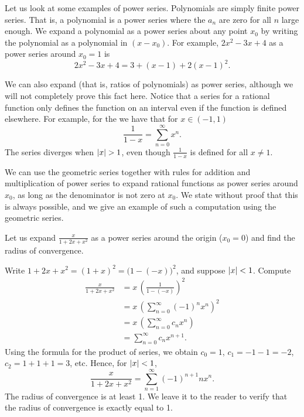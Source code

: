 Let us look at some examples of power series.
Polynomials are simply finite power series.  That is, a polynomial
is a power series where
the $a_n$ are zero for all $n$ large enough.  We expand
a polynomial as a power series about any point $x_0$ by writing
the polynomial as a polynomial in $(x-x_0)$.  For example,
$2x^2-3x+4$ as a power series around $x_0 = 1$ is
\begin{equation*}
2x^2-3x+4 = 3 + (x-1) + 2{(x-1)}^2 .
\end{equation*}

We can also expand
\emph{} (that is, ratios of polynomials)
as power series, although we will not completely prove this fact here.
Notice that a series for a rational function only defines the function
on an interval even if the function is defined elsewhere.  For example, for
the \emph{} we have that for
$x \in (-1,1)$
\begin{equation*}
\frac{1}{1-x} =
\sum_{n=0}^\infty x^n .
\end{equation*}
The series diverges when $\left\lvert {x} \right\rvert > 1$, even though $\frac{1}{1-x}$ is
defined for all $x \not= 1$.

We can use the geometric series together with rules for addition and
multiplication of power series to expand rational functions as power
series around $x_0$,
as long as the denominator is not zero at $x_0$.  We state without
proof that this is always possible, and we give an example of such
a computation using the geometric series.

\begin{example}
Let us expand $\frac{x}{1+2x+x^2}$ as a power series around the origin ($x_0 = 0$) and
find the radius of convergence.

Write $1+2x+x^2 = {(1+x)}^2 = {\bigl(1-(-x)\bigr)}^2$, and suppose
$\left\lvert {x} \right\rvert < 1$.  Compute
\begin{equation*}
\begin{split}
\frac{x}{1+2x+x^2}
&=
x \,
{\left(
\frac{1}{1-(-x)}
\right)}^2
\\
&=
x \,
{\left( 
\sum_{n=0}^\infty {(-1)}^n x^n 
\right)}^2
\\
&=
x \,
\left(
\sum_{n=0}^\infty c_n x^n 
\right)
\\
&=
\sum_{n=0}^\infty c_n x^{n+1} .
\end{split}
\end{equation*}
Using the formula for the product of series,
we obtain $c_0 = 1$, $c_1 = -1 -1 = -2$, $c_2 = 1+1+1 = 3$, etc.
Hence, for $\left\lvert {x} \right\rvert < 1$, 
\begin{equation*}
\frac{x}{1+2x+x^2}
=
\sum_{n=1}^\infty {(-1)}^{n+1} n x^n .
\end{equation*}
The radius of convergence is at least 1.  We leave it to the reader to
verify that the radius of convergence is exactly equal to 1.
\end{example}

